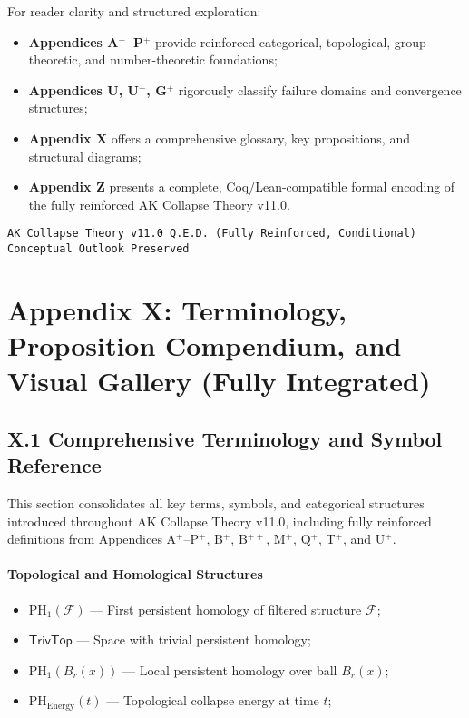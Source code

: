 \documentclass[11pt]{article}
\begin{document}
For reader clarity and structured exploration:

\begin{itemize}
    \item \textbf{Appendices A$^{+}$–P$^{+}$} provide reinforced categorical, topological, group-theoretic, and number-theoretic foundations;
    \item \textbf{Appendices U, U$^{+}$, G$^{+}$} rigorously classify failure domains and convergence structures;
    \item \textbf{Appendix X} offers a comprehensive glossary, key propositions, and structural diagrams;
    \item \textbf{Appendix Z} presents a complete, Coq/Lean-compatible formal encoding of the fully reinforced AK Collapse Theory v11.0.
\end{itemize}

\begin{center}
\texttt{AK Collapse Theory v11.0 \quad Q.E.D. (Fully Reinforced, Conditional) \quad Conceptual Outlook Preserved}
\end{center}




\section*{Appendix X: Terminology, Proposition Compendium, and Visual Gallery (Fully Integrated)}

\subsection*{X.1 Comprehensive Terminology and Symbol Reference}

This section consolidates all key terms, symbols, and categorical structures introduced throughout AK Collapse Theory v11.0, including fully reinforced definitions from Appendices A$^{+}$–P$^{+}$, B$^{+}$, B$^{++}$, M$^{+}$, Q$^{+}$, T$^{+}$, and U$^{+}$.

\paragraph{Topological and Homological Structures}
\begin{itemize}
    \item $\mathrm{PH}_1(\mathcal{F})$ — First persistent homology of filtered structure $\mathcal{F}$;
    \item $\mathsf{TrivTop}$ — Space with trivial persistent homology;
    \item $\mathrm{PH}_1(B_r(x))$ — Local persistent homology over ball $B_r(x)$;
    \item $\mathrm{PH}_{\mathrm{Energy}}(t)$ — Topological collapse energy at time $t$;
\end{itemize}
\end{document}
